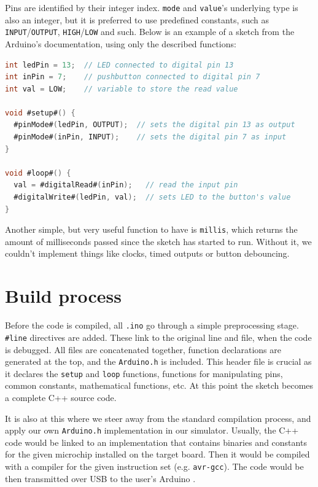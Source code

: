 Pins are identified by their integer index. \texttt{mode} and \texttt{value}'s underlying type is also an integer, but it is preferred to use predefined constants, such as \texttt{INPUT}/\texttt{OUTPUT}, \texttt{HIGH}/\texttt{LOW} and such. Below is an example of a sketch from the Arduino's documentation, using only the described functions:

\begin{lstlisting}[language=csharp, caption=Sketch example \cite{arduino_digital_read}]
int ledPin = 13;  // LED connected to digital pin 13
int inPin = 7;    // pushbutton connected to digital pin 7
int val = LOW;    // variable to store the read value

void #setup#() {
  #pinMode#(ledPin, OUTPUT);  // sets the digital pin 13 as output
  #pinMode#(inPin, INPUT);    // sets the digital pin 7 as input
}

void #loop#() {
  val = #digitalRead#(inPin);   // read the input pin
  #digitalWrite#(ledPin, val);  // sets LED to the button's value
}
\end{lstlisting}

Another simple, but very useful function to have is \texttt{millis}, which returns the amount of milliseconds passed since the sketch has started to run. Without it, we couldn't implement things like clocks, timed outputs or button debouncing.

\section{Build process} \label{sec:arduino_build}

Before the code is compiled, all \texttt{.ino} go through a simple preprocessing stage. \texttt{\#line} directives are added. These link to the original line and file, when the code is debugged. All files are concatenated together, function declarations are generated at the top, and the \texttt{Arduino.h} is included. This header file is crucial as it declares the \texttt{setup} and \texttt{loop} functions, functions for manipulating pins, common constants, mathematical functions, etc. At this point the sketch becomes a complete C++ source code.

It is also at this where we steer away from the standard compilation process, and apply our own \texttt{Arduino.h} implementation in our simulator. Usually, the C++ code would be linked to an implementation that contains binaries and constants for the given microchip installed on the target board. Then it would be compiled with a compiler for the given instruction set (e.g. \texttt{avr-gcc}). The code would be then transmitted over USB to the user's Arduino \cite{arduino_sketch_build}.

